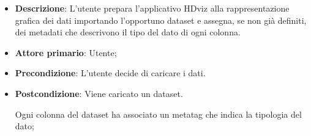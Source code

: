 \begin{itemize}
    \item \textbf{Descrizione}: L'utente prepara l'applicativo HDviz alla rappresentazione
                                grafica dei dati importando l'opportuno dataset e assegna, 
                                se non già definiti, dei metadati 
                                che descrivono il tipo del dato di ogni colonna.
	
    \item \textbf{Attore primario}: Utente;
    
    \item \textbf{Precondizione}:   L'utente decide di caricare i dati.

    \item \textbf{Postcondizione}:  Viene caricato un dataset. 
    
                                    Ogni colonna del dataset ha associato
                                    un metatag che indica la tipologia del dato;


\end{itemize}
